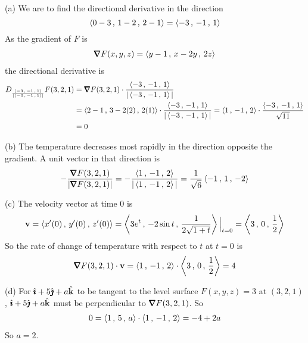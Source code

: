 \begin{solution}
(a) 
We are to find the directional derivative in the direction
\begin{equation*}
\left< 0-3\,,\,1-2\,,\,2-1\right> = \left< -3\,,\,-1\,,\,1\right>
\end{equation*}
As the gradient of $F$ is
\begin{align*}
\vnabla F(x,y,z) = \llt y-1\,,\,x-2y\,,\,2z \rgt
\end{align*}
the directional derivative is
\begin{align*}
D_{\frac{\llt -3\,,\,-1\,,\,1\rgt}{|\llt -3\,,\,-1\,,\,1\rgt|}}F(3,2,1)
&=\vnabla F(3,2,1)\cdot 
  \frac{\llt -3\,,\,-1\,,\,1\rgt}{|\llt -3\,,\,-1\,,\,1\rgt|} \\
&= \llt 2-1\,,\,3-2(2)\,,\,2(1) \rgt
\cdot   \frac{\llt -3\,,\,-1\,,\,1\rgt}{|\llt -3\,,\,-1\,,\,1\rgt|}
=\llt 1\,,\,-1\,,\,2\rgt \cdot   \frac{\llt -3\,,\,-1\,,\,1\rgt}{\sqrt{11}}\\
&=0
\end{align*}

(b) The temperature decreases most rapidly in the direction opposite the
gradient. A unit vector in that direction is
\begin{align*}
   -\frac{\vnabla F(3,2,1)}{|\vnabla F(3,2,1)|}
=  -\frac{\llt 1\,,\,-1\,,\,2 \rgt}{|\llt 1\,,\,-1\,,\,2 \rgt|}
= \frac{1}{\sqrt{6}}\llt -1\,,\,1\,,\,-2 \rgt 
\end{align*}

(c) The velocity vector at time $0$ is
\begin{align*}
\mathbf{v}=\left< x'(0)\,,\,y'(0)\,,\,z'(0)\right>
=\left< 3e^t\,,\,-2\sin t\,,\,\frac{1}{2\sqrt{1+t}}\right>\Big|_{t=0}
=\left< 3\,,\,0\,,\,\frac{1}{2}\right>
\end{align*}
So the rate of change of temperature with respect to $t$ at $t=0$ is
\begin{align*}
\vnabla F(3,2,1)\cdot \vv
=\llt 1\,,\,-1\,,\,2 \rgt\cdot 
   \llt 3\,,\,0\,,\,\frac{1}{2}\rgt
=4
\end{align*}

(d) For $\hat{\pmb{\imath}}+5\hat{\pmb{\jmath}}+a\hat{\mathbf{k}}$ to be tangent to the level surface
$F(x, y, z) = 3$ at $(3, 2, 1)$, $\hat{\pmb{\imath}}+5\hat{\pmb{\jmath}}+a\hat{\mathbf{k}}$ must be perpendicular
to  $\vnabla F(3,2,1)$. So
\begin{align*}
0=\left< 1\,,\,5\,,\,a \right> \cdot \left< 1\,,\,-1\,,\,2 \right>
 = -4+2a
\end{align*}
So $a=2$.
\end{solution}

